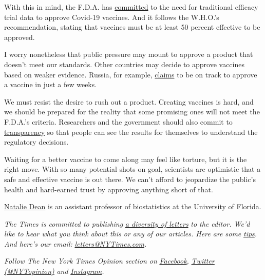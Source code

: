 With this in mind, the F.D.A. has
\href{https://www.fda.gov/regulatory-information/search-fda-guidance-documents/development-and-licensure-vaccines-prevent-covid-19}{committed}
to the need for traditional efficacy trial data to approve Covid-19
vaccines. And it follows the W.H.O.'s recommendation, stating that
vaccines must be at least 50 percent effective to be approved.

I worry nonetheless that public pressure may mount to approve a product
that doesn't meet our standards. Other countries may decide to approve
vaccines based on weaker evidence. Russia, for example,
\href{https://www.wsj.com/articles/russia-seeks-to-register-first-coronavirus-vaccine-in-august-11596047326}{claims}
to be on track to approve a vaccine in just a few weeks.

We must resist the desire to rush out a product. Creating vaccines is
hard, and we should be prepared for the reality that some promising ones
will not meet the F.D.A.'s criteria. Researchers and the government
should also commit to
\href{https://www.thenation.com/article/society/vaccine-coronavirus-october-surprise/}{transparency}
so that people can see the results for themselves to understand the
regulatory decisions.

Waiting for a better vaccine to come along may feel like torture, but it
is the right move. With so many potential shots on goal, scientists are
optimistic that a safe and effective vaccine is out there. We can't
afford to jeopardize the public's health and hard-earned trust by
approving anything short of that.

\href{https://www.nataliexdean.com/}{Natalie Dean} is an assistant
professor of biostatistics at the University of Florida.

\emph{The Times is committed to publishing}
\href{https://www.nytimes3xbfgragh.onion/2019/01/31/opinion/letters/letters-to-editor-new-york-times-women.html}{\emph{a
diversity of letters}} \emph{to the editor. We'd like to hear what you
think about this or any of our articles. Here are some}
\href{https://help.nytimes3xbfgragh.onion/hc/en-us/articles/115014925288-How-to-submit-a-letter-to-the-editor}{\emph{tips}}\emph{.
And here's our email:}
\href{mailto:letters@NYTimes.com}{\emph{letters@NYTimes.com}}\emph{.}

\emph{Follow The New York Times Opinion section on}
\href{https://www.facebookcorewwwi.onion/nytopinion}{\emph{Facebook}}\emph{,}
\href{http://twitter.com/NYTOpinion}{\emph{Twitter (@NYTopinion)}}
\emph{and}
\href{https://www.instagram.com/nytopinion/}{\emph{Instagram}}\emph{.}

